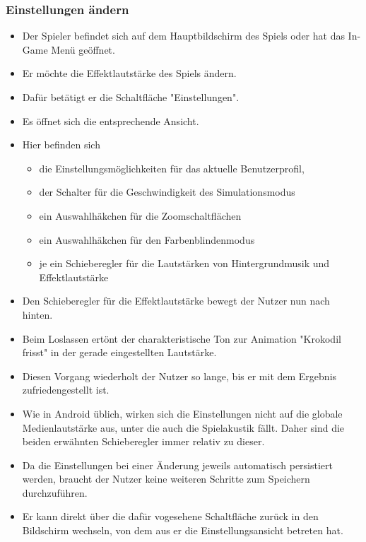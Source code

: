 \subsubsection{Einstellungen ändern}
\begin{itemize}
\item Der Spieler befindet sich auf dem Hauptbildschirm des Spiels oder hat das In-Game Menü 
geöffnet.
\item Er möchte die Effektlautstärke des Spiels ändern.
\item Dafür betätigt er die Schaltfläche "Einstellungen".
\item Es öffnet sich die entsprechende Ansicht.
\item Hier befinden sich
	\begin{itemize}
	\item die Einstellungsmöglichkeiten für das aktuelle Benutzerprofil, 
	\item der Schalter für die Geschwindigkeit des Simulationsmodus
	\item ein Auswahlhäkchen für die Zoomschaltflächen
	\item ein Auswahlhäkchen für den Farbenblindenmodus
	\item je ein Schieberegler für die Lautstärken von Hintergrundmusik und Effektlautstärke
	\end{itemize}
\item Den Schieberegler für die Effektlautstärke bewegt der Nutzer nun nach hinten.
\item Beim Loslassen ertönt der charakteristische Ton zur Animation "Krokodil frisst" in der
gerade eingestellten Lautstärke.
\item Diesen Vorgang wiederholt der Nutzer so lange, bis er mit dem Ergebnis zufriedengestellt ist.
\item Wie in Android üblich, wirken sich die Einstellungen nicht auf die globale Medienlautstärke
aus, unter die auch die Spielakustik fällt. Daher sind die beiden erwähnten Schieberegler immer relativ zu dieser. 
\item Da die Einstellungen bei einer Änderung jeweils automatisch persistiert werden, braucht der
Nutzer keine weiteren Schritte zum Speichern durchzuführen.
\item Er kann direkt über die dafür vogesehene Schaltfläche zurück in den Bildschirm
wechseln, von dem aus er die Einstellungsansicht betreten hat.
\end{itemize}
